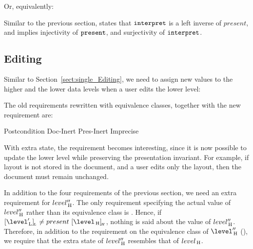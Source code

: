 Or, equivalently:


Similar to the previous section,  states that ${\tt interpret}$ is a left inverse of $present$, and implies injectivity of ${\tt present}$, and surjectivity of ${\tt interpret}$.




\subsection{Editing} \label{sect:singleExtra_Editing}

Similar to Section~\ref{sect:single_Editing}, we need to assign new values to the higher and the lower data levels when a user edits the lower level:


The old requirements rewritten with equivalence classes, together with the new requirement are:

		{Postcondition}
  {Doc-Inert}
		{Pres-Inert}
	{Imprecise}

With extra state, the  requirement becomes interesting, since it is now possible to update the lower level while preserving the presentation invariant. For example, if layout is not stored in the document, and a user edits only the layout, then the document must remain unchanged.

In addition to the four requirements of the previous section, we need an extra requirement for $level''_{\, \mathrm H}$. The only requirement specifying the actual value of $level''_{\, \mathrm H}$ rather than its equivalence class is . Hence, if 
$\eqcl{\level'\L}{L} \neq present~\eqcl{\level\H}{H}$, nothing is said about the value of $level''_{\, \mathrm H}$. Therefore, in addition to the requirement on the  equivalence class of $\level''\H$ (), we require that the extra state of $level''_{\, \mathrm H}$ resembles that of $level_{\, \mathrm H}$. 

